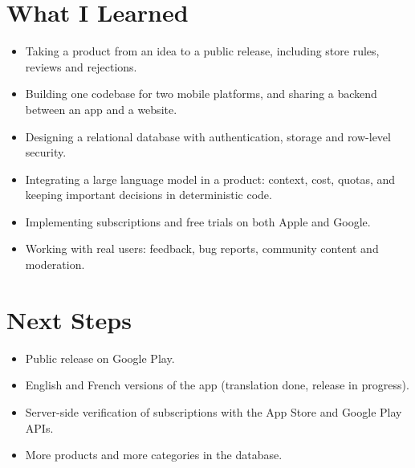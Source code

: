 \documentclass[a4paper,11pt]{article}
\begin{document}
\section{What I Learned}

\begin{itemize}
  \item Taking a product from an idea to a public release, including store rules, reviews and rejections.
  \item Building one codebase for two mobile platforms, and sharing a backend between an app and a website.
  \item Designing a relational database with authentication, storage and row-level security.
  \item Integrating a large language model in a product: context, cost, quotas, and keeping important decisions in deterministic code.
  \item Implementing subscriptions and free trials on both Apple and Google.
  \item Working with real users: feedback, bug reports, community content and moderation.
\end{itemize}

\section{Next Steps}
\begin{itemize}
  \item Public release on Google Play.
  \item English and French versions of the app (translation done, release in progress).
  \item Server-side verification of subscriptions with the App Store and Google Play APIs.
  \item More products and more categories in the database.
\end{itemize}
\end{document}
